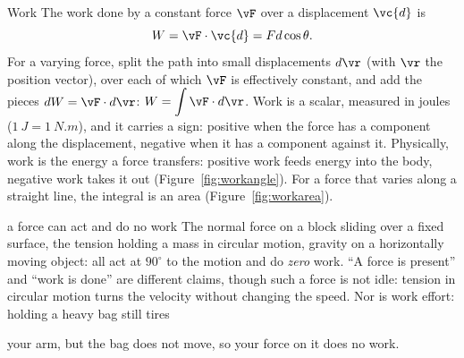 \begin{defbox}{Work}
The work done by a constant force $\vF$ over a displacement $\vc{d}$ is
\[
W=\vF\cdot\vc{d}=Fd\cos\theta.
\]
For a varying force, split the path into small displacements $d\vr$ (with $\vr$ the position vector), over each of which $\vF$ is effectively
constant, and add the pieces $dW=\vF\cdot d\vr$: $W=\displaystyle\int \vF\cdot d\vr$. Work is a scalar,
measured in joules ($\SI{1}{J}=\SI{1}{N.m}$), and it carries a sign: positive when the force has a
component along the displacement, negative when it has a component against it. Physically, work is the
energy a force transfers: positive work feeds energy into the body, negative work takes it out
(Figure~\ref{fig:workangle}). For a force that varies along a straight line, the integral is an area
(Figure~\ref{fig:workarea}).
\end{defbox}

\begin{figure}[htbp]
\centering
{}
\end{figure}

\begin{trapbox}{a force can act and do no work}
The normal force on a block sliding over a fixed surface, the tension holding a mass in circular motion,
gravity on a horizontally moving object: all act at $90^\circ$ to the motion and do \emph{zero} work. ``A force is
present'' and ``work is done'' are different claims, though such a force is not idle: tension in circular
motion turns the velocity without changing the speed. Nor is work effort: holding a heavy bag still tires

your arm, but the bag does not move, so your force on it does no work.
\end{trapbox}

\begin{figure}[htbp]
\centering
{}
\end{figure}

